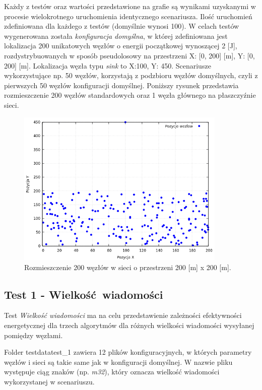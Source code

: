 \documentclass[a4paper,12pt,twoside,openany]{report}
\begin{document}
Każdy z testów oraz wartości przedstawione na grafie są wynikami uzyskanymi w procesie wielokrotnego uruchomienia identycznego scenariusza. 
Ilość uruchomień zdefiniowana dla każdego z testów (domyślnie wynosi 100).
W celach testów wygenerowana została \textit{konfiguracja domyślna}, w której zdefiniowana jest lokalizacja 200 unikatowych węzłów o energii początkowej wynoszącej 2 [J], 
rozdystrybuowanych w sposób pseudolosowy na przestrzeni X: [0, 200] [m], Y: [0, 200] [m]. Lokalizacja węzła typu \textit{sink} to X:100, Y: 450.
Scenariusze wykorzystujące np. 50 węzłów, korzystają z podzbioru węzłów domyślnych, czyli z pierwszych 50 węzłów konfiguracji domyślnej.
Poniższy rysunek przedstawia rozmieszczenie 200 węzłów standardowych oraz 1 węzła głównego na płaszczyźnie sieci.

\begin{figure}[H]
 \centering
 \includegraphics[width=10cm]{images/scenariusz_lokalizacja.png}
 \caption{Rozmieszczenie 200 węzłów w sieci o przestrzeni 200 [m] x 200 [m].}
\end{figure}

\subsection{Test 1 - Wielkość wiadomości}

Test \textit{Wielkość wiadomości} ma na celu przedstawienie zależności efektywności energetycznej dla trzech algorytmów dla różnych wielkości wiadomości wysyłanej pomiędzy węzłami.

Folder testdata\/test\_1 zawiera 12 plików konfiguracyjnych, w których parametry węzłów i sieci są takie same jak w konfiguracji domyślnej.
W nazwie pliku występuje ciąg znaków (np. \textit{m32}), który oznacza wielkość wiadomości wykorzystanej w scenariuszu.
\end{document}
